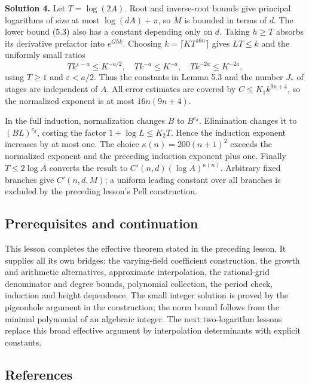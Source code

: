 \documentclass[
  11pt,
  a4paper,
]{article}
\begin{document}
\textbf{Solution 4.} Let \(T=\log(2A)\). Root and inverse-root bounds
give principal logarithms of size at most \(\log(dA)+\pi\), so \(M\) is
bounded in terms of \(d\). The lower bound (5.3) also has a constant
depending only on \(d\). Taking \(h\ge T\) absorbs its derivative
prefactor into \(e^{Ghk}\). Choosing \(k=\lceil KT^{16n}\rceil\) gives
\(LT\le k\) and the uniformly small ratios \[
Tk^{\varepsilon-a}\le K^{-a/2},\quad
Tk^{-a}\le K^{-a},\quad Tk^{-2a}\le K^{-2a},
\] using \(T\ge1\) and \(\varepsilon<a/2\). Thus the constants in Lemma
5.3 and the number \(J_*\) of stages are independent of \(A\). All error
estimates are covered by \(C\le K_1k^{9n+4}\), so the normalized
exponent is at most \(16n(9n+4)\).

In the full induction, normalization changes \(B\) to \(B^{c_d}\).
Elimination changes it to \((BL)^{c_d}\), costing the factor
\(1+\log L\le K_2T\). Hence the induction exponent increases by at most
one. The choice \(\kappa(n)=200(n+1)^2\) exceeds the normalized exponent
and the preceding induction exponent plus one. Finally \(T\le2\log A\)
converts the result to \(C'(n,d)(\log A)^{\kappa(n)}\). Arbitrary fixed
branches give \(C'(n,d,M)\); a uniform leading constant over all
branches is excluded by the preceding lesson's Pell construction.

\subsection{Prerequisites and
continuation}\label{prerequisites-and-continuation}

This lesson completes the effective theorem stated in the preceding
lesson. It supplies all its own bridges: the varying-field coefficient
construction, the growth and arithmetic alternatives, approximate
interpolation, the rational-grid denominator and degree bounds,
polynomial collection, the period check, induction and height
dependence. The small integer solution is proved by the pigeonhole
argument in the construction; the norm bound follows from the minimal
polynomial of an algebraic integer. The next two-logarithm lessons
replace this broad effective argument by interpolation determinants with
explicit constants.

\subsection{References}\label{references}
\end{document}
